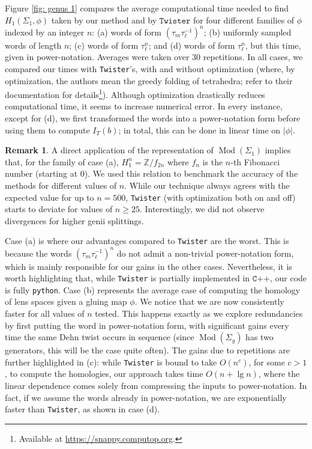 \documentclass[11pt]{amsart}
\newcommand{\Z}{\mathbb{Z}}
\DeclareMathOperator{\Mod}{Mod}
\numberwithin{equation}{section}
\theoremstyle{plain}
\theoremstyle{definition}
\newtheorem{remark}[equation]{Remark}
\begin{document}
Figure \ref{fig: genus 1} compares the average computational time needed to find $H_1(\Sigma_1,\phi)$ taken by our method and by $\texttt{Twister}$ for four different families of $\phi$ indexed by an integer $n$: (a) words of form $(\tau_m\tau_\ell^{-1})^n$; (b) uniformly sampled words of length $n$; (c) words of form $\tau_\ell^n$; and (d) words of form $\tau_\ell^n$, but this time, given in power-notation. 
Averages were taken over 30 repetitions.
In all cases, we compared our times with \texttt{Twister}'s, with and without optimization (where, by optimization, the authors mean the greedy folding of tetrahedra; refer to their documentation for details\footnote{Available at \url{https://snappy.computop.org}.}).
Although optimization drastically reduces computational time, it seems to increase numerical error.
In every instance, except for (d), we first transformed the words into a power-notation form before using them to compute $I_T(b)$; in total, this can be done in linear time on $|\phi|$.

\begin{remark}\label{rm: numerical error}
    A direct application of the representation of $\Mod(\Sigma_1)$ implies that, for the family of case (a), $H_1^n=\Z/f_{2n}$ where $f_n$ is the $n$-th Fibonacci number (starting at 0).
    We used this relation to benchmark the accuracy of the methods for different values of $n$. 
    While our technique always agrees with the expected value for up to $n=500$, \texttt{Twister} (with optimization both on and off) starts to deviate for values of $n\geq 25$.
    Interestingly, we did not observe divergences for higher genii splittings. 
\end{remark}

Case (a) is where our advantages compared to \texttt{Twister} are the worst.
This is because the words $(\tau_m\tau_\ell^{-1})^n$ do not admit a non-trivial power-notation form, which is mainly responsible for our gains in the other cases.
Nevertheless, it is worth highlighting that, while \texttt{Twister} is partially implemented in $\texttt{C++}$, our code is fully \texttt{python}.
Case (b) represents the average case of computing the homology of lens spaces given a gluing map $\phi$. 
We notice that we are now consistently faster for all values of $n$ tested.
This happens exactly as we explore redundancies by first putting the word in power-notation form, with significant gains every time the same Dehn twist occurs in sequence (since $\Mod(\Sigma_g)$ has two generators, this will be the case quite often).
The gains due to repetitions are further highlighted in (c): while \texttt{Twister} is bound to take $O(n^c)$, for some $c>1$, to compute the homologies, our approach takes time $O(n+\lg n)$, where the linear dependence comes solely from compressing the inputs to power-notation. 
In fact, if we assume the words already in power-notation, we are exponentially faster than \texttt{Twister}, as shown in case (d).
\end{document}
